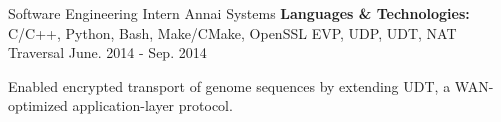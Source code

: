 \begin{cventries}
  \cventry
    {Software Engineering Intern}
    {Annai Systems}
    {\textbf{Languages \& Technologies:} C/C++, Python, Bash, Make/CMake, OpenSSL EVP, UDP, UDT, NAT Traversal}
    {June. 2014 - Sep. 2014}
    {
      \begin{cvitems}
        \item {Enabled encrypted transport of genome sequences by extending UDT, a WAN-optimized application-layer protocol.}
      \end{cvitems}
    }

\end{cventries}
